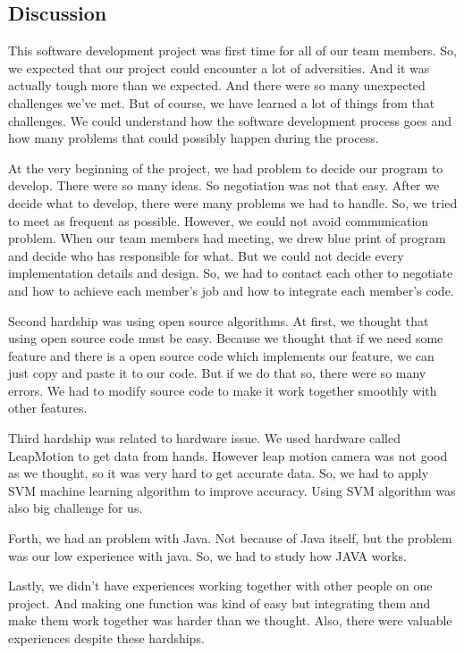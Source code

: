 \documentclass[10pt,journal,compsoc]{IEEEtran}
\begin{document}
\subsection{Discussion\\}
This software development project was first time for all of our team members. So, we expected that our project could encounter a lot of adversities. And it was actually tough more than we expected. And there were so many unexpected challenges we’ve met. But of course, we have learned a lot of things from that challenges. We could understand how the software development process goes and how many problems that could possibly happen during the process.

At the very beginning of the project, we had problem to decide our program to develop. There were so many ideas. So negotiation was not that easy. After we decide what to develop, there were many problems we had to handle. So, we tried to meet as frequent as possible. However, we could not avoid communication problem. When our team members had meeting, we drew blue print of program and decide who has responsible for what. But we could not decide every implementation details and design. So, we had to contact each other to negotiate and how to achieve each member's job and how to integrate each member's code. 

Second hardship was using open source algorithms. At first, we thought that using open source code must be easy. Because we thought that if we need some feature and there is a open source code which implements our feature, we can just copy and paste it to our code. But if we do that so, there were so many errors. We had to modify source code to make it work together smoothly with other features.

Third hardship was related to hardware issue. We used hardware called LeapMotion to get data from hands. However leap motion camera was not good as we thought, so it was very hard to get accurate data. So, we had to apply SVM machine learning algorithm to improve accuracy. Using SVM algorithm was also big challenge for us.

Forth, we had an problem with Java. Not because of Java itself, but the problem was our low experience with java. So, we had to study how JAVA works.

Lastly, we didn’t have experiences working together with other people on one project. And making one function was kind of easy but integrating them and make them work together was harder than we thought.
Also, there were valuable experiences despite these hardships.
\end{document}
